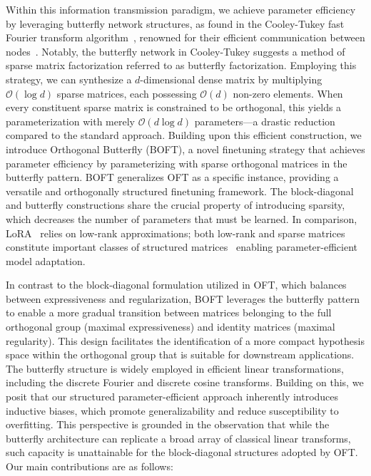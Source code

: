 Within this information transmission paradigm, we achieve parameter efficiency by leveraging butterfly network structures, as found in the Cooley-Tukey fast Fourier transform algorithm~\cite{cooley1965algorithm}, renowned for their efficient communication between nodes~\cite{klasing1994broadcasting}. Notably, the butterfly network in Cooley-Tukey suggests a method of sparse matrix factorization referred to as butterfly factorization. Employing this strategy, we can synthesize a $d$-dimensional dense matrix by multiplying $\mathcal{O}(\log d)$ sparse matrices, each possessing $\mathcal{O}(d)$ non-zero elements. When every constituent sparse matrix is constrained to be orthogonal, this yields a parameterization with merely $\mathcal{O}(d\log d)$ parameters—a drastic reduction compared to the standard approach. Building upon this efficient construction, we introduce Orthogonal Butterfly (BOFT), a novel finetuning strategy that achieves parameter efficiency by parameterizing with sparse orthogonal matrices in the butterfly pattern. BOFT generalizes OFT as a specific instance, providing a versatile and orthogonally structured finetuning framework. The block-diagonal and butterfly constructions share the crucial property of introducing sparsity, which decreases the number of parameters that must be learned. In comparison, LoRA~\cite{hulora2022} relies on low-rank approximations; both low-rank and sparse matrices constitute important classes of structured matrices~\cite{candes2011robust} enabling parameter-efficient model adaptation.

In contrast to the block-diagonal formulation utilized in OFT, which balances between expressiveness and regularization, BOFT leverages the butterfly pattern to enable a more gradual transition between matrices belonging to the full orthogonal group (maximal expressiveness) and identity matrices (maximal regularity). This design facilitates the identification of a more compact hypothesis space within the orthogonal group that is suitable for downstream applications. The butterfly structure is widely employed in efficient linear transformations, including the discrete Fourier and discrete cosine transforms. Building on this, we posit that our structured parameter-efficient approach inherently introduces inductive biases, which promote generalizability and reduce susceptibility to overfitting. This perspective is grounded in the observation that while the butterfly architecture can replicate a broad array of classical linear transforms, such capacity is unattainable for the block-diagonal structures adopted by OFT. Our main contributions are as follows:

